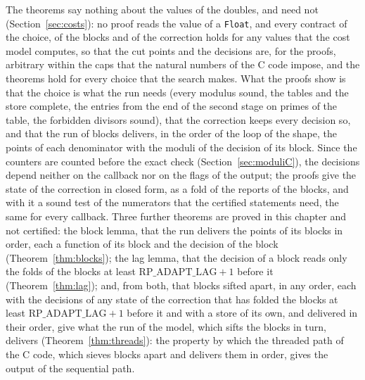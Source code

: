 The theorems say nothing about the values of the doubles, and need not (Section~\ref{sec:costs}): no
proof reads the value of a \verb|Float|, and every contract of the choice, of the blocks and of the
correction holds for any values that the cost model computes, so that the cut points and the
decisions are, for the proofs, arbitrary within the caps that the natural numbers of the C code
impose, and the theorems hold for every choice that the search makes. What the proofs show is that
the choice is what the run needs (every modulus sound, the tables and the store complete, the
entries from the end of the second stage on primes of the table, the forbidden divisors sound), that
the correction keeps every decision so, and that the run of blocks delivers, in the order of the
loop of the shape, the points of each denominator with the moduli of the decision of its block.
Since the counters are counted before the exact check (Section~\ref{sec:moduliC}), the decisions
depend neither on the callback nor on the flags of the output; the proofs give the state of the
correction in closed form, as a fold of the reports of the blocks, and with it a sound test of the
numerators that the certified statements need, the same for every callback. Three further theorems
are proved in this chapter and not certified: the block lemma, that the run delivers the points of
its blocks in order, each a function of its block and the decision of the block
(Theorem~\ref{thm:blocks}); the lag lemma, that the decision of a block reads only the folds of the
blocks at least $\mathrm{RP\_ADAPT\_LAG} + 1$ before it (Theorem~\ref{thm:lag}); and, from both,
that blocks sifted apart, in any order, each with the decisions of any state of the correction that
has folded the blocks at least $\mathrm{RP\_ADAPT\_LAG} + 1$ before it and with a store of its own,
and delivered in their order, give what the run of the model, which sifts the blocks in turn,
delivers (Theorem~\ref{thm:threads}): the property by which the threaded path of the C code, which
sieves blocks apart and delivers them in order, gives the output of the sequential path.

